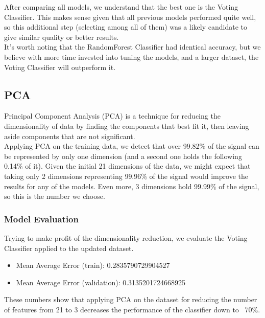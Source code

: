 After comparing all models, we understand that the best one is the Voting Classifier.
This makes sense given that all previous models performed quite well, so this additional step (selecting among all of them) was a likely candidate to give similar quality or better results.\\
It's worth noting that the RandomForest Classifier had identical accuracy, but we believe with more time invested into tuning the models, and a larger dataset, the Voting Classifier will outperform it.

\subsection{PCA}
Principal Component Analysis (PCA) is a technique for reducing the dimensionality of data by finding the components that best fit it, then leaving aside components that are not significant.\\
Applying PCA on the training data, we detect that over 99.82\% of the signal can be represented by only one dimension (and a second one holds the following 0.14\% of it).
Given the initial 21 dimensions of the data, we might expect that taking only 2 dimensions representing 99.96\% of the signal would improve the results for any of the models.
Even more, 3 dimensions hold 99.99\% of the signal, so this is the number we choose.

\subsubsection{Model Evaluation}
Trying to make profit of the dimensionality reduction, we evaluate the Voting Classifier applied to the updated dataset.
\begin{itemize}
    \item Mean Average Error (train): 0.2835790729904527
    \item Mean Average Error (validation): 0.3135201724668925
\end{itemize}
These numbers show that applying PCA on the dataset for reducing the number of features from 21 to 3 decreases the performance of the classifier down to ~70\%.
